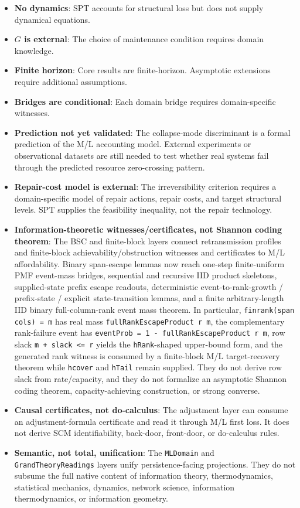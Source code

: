 \documentclass[11pt,a4paper]{article}
\begin{document}
\begin{itemize}
\item \textbf{No dynamics}: SPT accounts for structural loss but does not supply dynamical equations.
\item \textbf{$G$ is external}: The choice of maintenance condition requires domain knowledge.
\item \textbf{Finite horizon}: Core results are finite-horizon. Asymptotic extensions require additional assumptions.
\item \textbf{Bridges are conditional}: Each domain bridge requires domain-specific witnesses.
\item \textbf{Prediction not yet validated}: The collapse-mode discriminant is a formal prediction of the M/L accounting model. External experiments or observational datasets are still needed to test whether real systems fail through the predicted resource zero-crossing pattern.
\item \textbf{Repair-cost model is external}: The irreversibility criterion requires a domain-specific model of repair actions, repair costs, and target structural levels. SPT supplies the feasibility inequality, not the repair technology.
\item \textbf{Information-theoretic witnesses/certificates, not Shannon coding theorem}: The BSC and finite-block layers connect retransmission profiles and finite-block achievability/obstruction witnesses and certificates to M/L affordability. Binary span-escape lemmas now reach one-step finite-uniform PMF event-mass bridges, sequential and recursive IID product skeletons, supplied-state prefix escape readouts, deterministic event-to-rank-growth / prefix-state / explicit state-transition lemmas, and a finite arbitrary-length IID binary full-column-rank event mass theorem. In particular, \texttt{finrank(span cols) = m} has real mass \texttt{fullRankEscapeProduct r m}, the complementary rank-failure event has \texttt{eventProb = 1 - fullRankEscapeProduct r m}, row slack \texttt{m + slack <= r} yields the \texttt{hRank}-shaped upper-bound form, and the generated rank witness is consumed by a finite-block M/L target-recovery theorem while \texttt{hcover} and \texttt{hTail} remain supplied. They do not derive row slack from rate/capacity, and they do not formalize an asymptotic Shannon coding theorem, capacity-achieving construction, or strong converse.
\item \textbf{Causal certificates, not do-calculus}: The adjustment layer can consume an adjustment-formula certificate and read it through M/L first loss. It does not derive SCM identifiability, back-door, front-door, or do-calculus rules.
\item \textbf{Semantic, not total, unification}: The \texttt{MLDomain} and \texttt{GrandTheoryReadings} layers unify persistence-facing projections. They do not subsume the full native content of information theory, thermodynamics, statistical mechanics, dynamics, network science, information thermodynamics, or information geometry.
\end{itemize}
\end{document}
